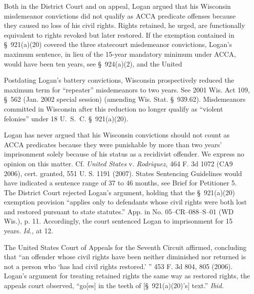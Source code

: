   Both in the District Court and on appeal, Logan argued that his Wisconsin misdemeanor convictions did not qualify as ACCA predicate offenses because they caused no loss of his civil rights. Rights retained, he urged, are functionally equivalent to rights revoked but later restored. If the exemption contained in \S~921(a)(20) covered the three statecourt misdemeanor convictions, Logan's maximum sentence, in lieu of the 15-year mandatory minimum under ACCA, would have been ten years, see \S~924(a)(2), and the United


  Postdating Logan's battery convictions, Wisconsin prospectively reduced the maximum term for ``repeater'' misdemeanors to two years. See 2001 Wis. Act 109, \S~562 (Jan. 2002 special session) (amending Wis. Stat. \S~939.62). Misdemeanors committed in Wisconsin after this reduction no longer qualify as ``violent felonies'' under 18 U.~S.~C. \S~921(a)(20).

  Logan has never argued that his Wisconsin convictions should not count as ACCA predicates because they were punishable by more than two years' imprisonment solely because of his status as a recidivist offender. We express no opinion on this matter. Cf. \emph{United States} v. \emph{Rodriquez,} 464 F. 3d 1072 (CA9 2006), cert. granted, 551 U. S. 1191 (2007). \newpage  States Sentencing Guidelines would have indicated a sentence range of 37 to 46 months, see Brief for Petitioner 5. The District Court rejected Logan's argument, holding that the \S~921(a)(20) exemption provision ``applies only to defendants whose civil rights were both lost and restored pursuant to state statutes.'' App. in No. 05--CR--088--S--01 (WD Wis.), p. 11. Accordingly, the court sentenced Logan to imprisonment for 15 years. \emph{Id.,} at 12.

  The United States Court of Appeals for the Seventh Circuit affirmed, concluding that ``an offender whose civil rights have been neither diminished nor returned is not a person who ‘has had civil rights restored.' '' 453 F. 3d 804, 805 (2006). Logan's argument for treating retained rights the same way as restored rights, the appeals court observed, ``go[es] in the teeth of [\S~921(a)(20)'s] text.'' \emph{Ibid.}

